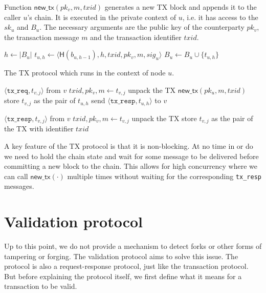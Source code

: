 \begin{algorithm}
    \caption{Function $\textsf{new\_tx}(pk_v, m, txid)$ generates a new TX block and appends it to the caller $u$'s chain.
    It is executed in the private context of $u$, i.e. it has access to the $sk_u$ and $B_u$.
    The necessary arguments are the public key of the counterparty $pk_v$, the transaction message $m$ and the transaction identifier $txid$.}
    \label{alg:new-tx}

    \begin{algorithmic}
    \State $h \gets |B_u|$
    \State $t_{u, h} \gets \langle \textsf{H}(b_{u, h - 1}), h, txid, pk_v, m, sig_u \rangle$
    \State $B_u \gets B_u \cup \{ t_{u, h} \}$
    \end{algorithmic}
\end{algorithm}

\begin{algorithm}
    \caption{The TX protocol which runs in the context of node $u$.}
    \label{alg:tx-proto}

    \begin{algorithmic}
        \Upon $\langle \texttt{tx\_req}, t_{v, j} \rangle$ from $v$
        \State $txid, pk_v, m \gets t_{v, j}$ \Comment unpack the TX
        \State $\textsf{new\_tx}(pk_u, m, txid)$
        \State store $t_{v, j}$ as the pair of $t_{u, h}$
        \State send $\langle \texttt{tx\_resp}, t_{u, h} \rangle$ to $v$

        \Upon $\langle \texttt{tx\_resp}, t_{v, j} \rangle$ from $v$
        \State $txid, pk_v, m \gets t_{v, j}$ \Comment unpack the TX
        \State store $t_{v, j}$ as the pair of the TX with identifier $txid$
    \end{algorithmic}
\end{algorithm}

A key feature of the TX protocol is that it is non-blocking.
At no time in  or  do we need to hold the chain state and wait for some message to be delivered before committing a new block to the chain.
This allows for high concurrency where we can call $\textsf{new\_tx}(\cdot)$ multiple times without waiting for the corresponding \texttt{tx\_resp} messages.

\section{Validation protocol}
\label{sec:vd-protocol}

Up to this point, we do not provide a mechanism to detect forks or other forms of tampering or forging.
The validation protocol aims to solve this issue.
The protocol is also a request-response protocol, just like the transaction protocol.
But before explaining the protocol itself, we first define what it means for a transaction to be valid.

